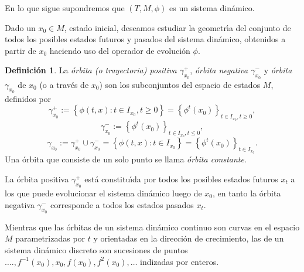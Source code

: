 \documentclass[11pt]{book}
\theoremstyle{definition}
\newtheorem{definition}{Definición}
\numberwithin{definition}{section}
\theoremstyle{theorem}
\numberwithin{theorem}{section}
\numberwithin{lemma}{section}
\numberwithin{corollary}{section}
\theoremstyle{plain}
\numberwithin{example}{section}
\begin{document}
En lo que sigue supondremos que $\left( T, M, \phi \right)$ es un sistema
din\'amico.

Dado un $x_0 \in M$, estado inicial, deseamos estudiar la geometr\'{\i}a del
conjunto de todos los posibles estados futuros y pasados del sistema
din\'amico, obtenidos a partir de $x_0$ haciendo uso del operador de
evoluci\'on $\phi$.

\begin{definition}
  \label{def:orbit}La {\emph{\'orbita (o trayectoria) positiva
  $\gamma^+_{x_0}$}}, {\emph{\'orbita negativa $\gamma^-_{x_0}$}} y
  {\emph{\'orbita $\gamma_{x_0}$}} de $x_0$ (o a trav\'es de $x_0$) son
  los subconjuntos del espacio de estados $M$, definidos por
  \[ \gamma^+_{x_0} := \left\{ \phi \left( t, x \right) : t \in I_{x_0},
     t \geq 0 \right\} = \left\{ \phi^t \left( x_0 \right) \right\}_{t
     \in I_{x_0}, t \geq 0}, \]
  \[ \gamma^-_{x_0} := \left\{ \phi^t \left( x_0 \right) \right\}_{t \in
     I_{x_0}, t \leq 0}, \]
  \[ \gamma_{x_0} := \gamma_{x_0}^+ \cup \gamma_{x_0}^- = \left\{ \phi
     \left( t, x \right) : t \in I_{x_0} \right\} = \left\{ \phi^t \left( x_0
     \right) \right\}_{t \in I_{x_0}} . \]
  Una \'orbita que consiste de un solo punto se llama {\emph{\'orbita
  constante}}.
\end{definition}

La \'orbita positiva $\gamma^+_{x_0}$ est\'a constitu\'{\i}da por todos los
posibles estados futuros $x_t$ a los que puede evolucionar el sistema
din\'amico luego de $x_0$, en tanto la \'orbita negativa $\gamma_{x_0}^-$
corresponde a todos los estados pasados $x_t$.

Mientras que las \'orbitas de un sistema din\'amico continuo son curvas en el
espacio $M$ parametrizadas por $t$ y orientadas en la direcci\'on de
crecimiento, las de un sistema din\'amico discreto son sucesiones de puntos
$\ldots ., f^{- 1} \left( x_0 \right), x_0, f \left( x_0 \right), f^2 \left(
x_0 \right), \ldots$ indizadas por enteros.
\end{document}

